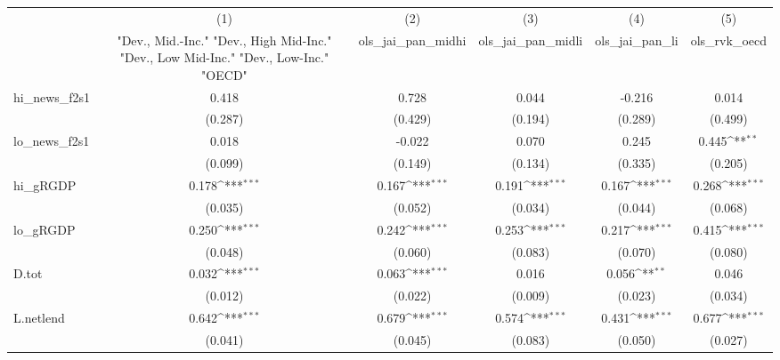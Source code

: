 {
\def\sym#1{\ifmmode^{#1}\else\(^{#1}\)\fi}
\begin{tabular}{l*{5}{c}}
\toprule
            &\multicolumn{1}{c}{(1)}&\multicolumn{1}{c}{(2)}&\multicolumn{1}{c}{(3)}&\multicolumn{1}{c}{(4)}&\multicolumn{1}{c}{(5)}\\
            &\multicolumn{1}{c}{ "Dev., Mid.-Inc." "Dev., High Mid-Inc." "Dev., Low Mid-Inc." "Dev., Low-Inc." "OECD" }&\multicolumn{1}{c}{ols\_jai\_pan\_midhi}&\multicolumn{1}{c}{ols\_jai\_pan\_midli}&\multicolumn{1}{c}{ols\_jai\_pan\_li}&\multicolumn{1}{c}{ols\_rvk\_oecd}\\
\midrule
hi\_news\_f2s1&       0.418         &       0.728         &       0.044         &      -0.216         &       0.014         \\
            &     (0.287)         &     (0.429)         &     (0.194)         &     (0.289)         &     (0.499)         \\
\addlinespace
lo\_news\_f2s1&       0.018         &      -0.022         &       0.070         &       0.245         &       0.445\sym{**} \\
            &     (0.099)         &     (0.149)         &     (0.134)         &     (0.335)         &     (0.205)         \\
\addlinespace
hi\_gRGDP    &       0.178\sym{***}&       0.167\sym{***}&       0.191\sym{***}&       0.167\sym{***}&       0.268\sym{***}\\
            &     (0.035)         &     (0.052)         &     (0.034)         &     (0.044)         &     (0.068)         \\
\addlinespace
lo\_gRGDP    &       0.250\sym{***}&       0.242\sym{***}&       0.253\sym{***}&       0.217\sym{***}&       0.415\sym{***}\\
            &     (0.048)         &     (0.060)         &     (0.083)         &     (0.070)         &     (0.080)         \\
\addlinespace
D.tot       &       0.032\sym{***}&       0.063\sym{***}&       0.016         &       0.056\sym{**} &       0.046         \\
            &     (0.012)         &     (0.022)         &     (0.009)         &     (0.023)         &     (0.034)         \\
\addlinespace
L.netlend   &       0.642\sym{***}&       0.679\sym{***}&       0.574\sym{***}&       0.431\sym{***}&       0.677\sym{***}\\
            &     (0.041)         &     (0.045)         &     (0.083)         &     (0.050)         &     (0.027)         \\

\end{tabular}}
